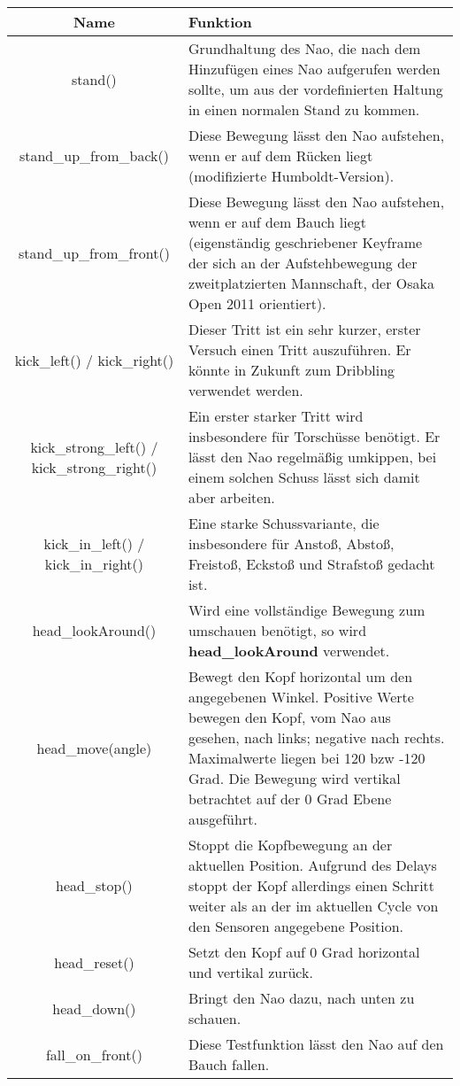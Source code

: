 \begin{tabular}{|c|p{9cm}|}
\hline 
Name & Funktion \\ 
\hline 
stand() & Grundhaltung des Nao, die nach dem Hinzufügen eines Nao aufgerufen 
werden sollte, um aus der vordefinierten Haltung in einen normalen Stand
 zu kommen. \\ 
\hline 
stand\_up\_from\_back() & Diese Bewegung lässt den Nao aufstehen, wenn er auf dem Rücken liegt (modifizierte Humboldt-Version). \\ 
\hline 
stand\_up\_from\_front() & Diese Bewegung lässt den Nao aufstehen, wenn er auf dem Bauch liegt 
(eigenständig geschriebener Keyframe der sich an der Aufstehbewegung der
 zweitplatzierten Mannschaft, der Osaka Open 2011 orientiert). \\ 
\hline 
kick\_left() / kick\_right() & Dieser Tritt ist ein sehr kurzer, erster Versuch einen Tritt auszuführen. Er könnte in Zukunft zum Dribbling verwendet werden. \\ 
\hline 
kick\_strong\_left() / kick\_strong\_right() & Ein erster starker Tritt wird insbesondere für Torschüsse benötigt. 
Er lässt den Nao regelmäßig umkippen, bei einem solchen Schuss lässt 
sich damit aber arbeiten. \\ 
\hline
kick\_in\_left() / kick\_in\_right() & Eine starke Schussvariante, die insbesondere für Anstoß, Abstoß, Freistoß, Eckstoß und Strafstoß gedacht ist. \\ 
\hline 
head\_lookAround() & Wird eine vollständige Bewegung zum umschauen benötigt, so wird \textbf{head\_lookAround} verwendet. \\ 
\hline 
head\_move(angle) & Bewegt den Kopf horizontal um den angegebenen Winkel. Positive Werte 
bewegen den Kopf, vom Nao aus gesehen, nach links; negative nach rechts.
 Maximalwerte liegen bei 120 bzw -120 Grad. Die Bewegung wird vertikal 
betrachtet auf der 0 Grad Ebene ausgeführt. \\ 
\hline 
head\_stop() & Stoppt die Kopfbewegung an der aktuellen Position. Aufgrund des 
Delays stoppt der Kopf allerdings einen Schritt weiter als an der im 
aktuellen Cycle von den Sensoren angegebene Position. \\ 
\hline 
head\_reset() & Setzt den Kopf auf 0 Grad horizontal und vertikal zurück. \\ 
\hline 
head\_down() & Bringt den Nao dazu, nach unten zu schauen. \\ 
\hline 
fall\_on\_front() & Diese Testfunktion lässt den Nao auf den Bauch fallen. \\ 

\end{tabular}
